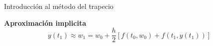 		\begin{frame}{Introducción al método del trapecio}
			\fontsize{11}{11}\selectfont				
			\begin{tcolorbox}[colback=ChetwodeBlue!10,colframe=ChetwodeBlue!60]
				\centering
				\textbf{Aproximación implicita}	
				\begin{equation*}
					y(t_1) \approx w_1 = w_0 + \frac{h}{2} \left[f(t_0,w_0) + f(t_1, y(t_1))\right]
				\end{equation*}							
			\end{tcolorbox}			

			
		\end{frame}

